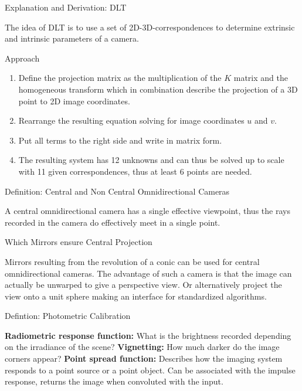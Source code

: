 \documentclass[10pt,a4paper]{scrartcl}
\begin{document}
\begin{multicols*}{2}
\begin{QandA}{Explanation and Derivation: DLT}
\item The idea of DLT is to use a set of 2D-3D-correspondences to determine extrinsic and intrinsic parameters of a camera.
\item Approach
\begin{enumerate}
\item Define the projection matrix as the multiplication of the $K$ matrix and the homogeneous transform which in combination describe the projection of a 3D point to 2D image coordinates.
\item Rearrange the resulting equation solving for image coordinates $u$ and $v$.
\item Put all terms to the right side and write in matrix form.
\item The resulting system has 12 unknowns and can thus be solved up to scale with 11 given correspondences, thus at least 6 points are needed.
\end{enumerate}
\end{QandA}

\begin{QandA}{Definition: Central and Non Central Omnidirectional Cameras}
\item A central omnidirectional camera has a single effective viewpoint, thus the rays recorded in the camera do effectively meet in a single point.
\end{QandA}

\begin{QandA}{Which Mirrors ensure Central Projection}
\item Mirrors resulting from the revolution of a conic can be used for central omnidirectional cameras. The advantage of such a camera is that the image can actually be unwarped to give a perspective view. Or alternatively project the view onto a unit sphere making an interface for standardized algorithms.
\end{QandA}

\begin{QandA}{Defintion: Photometric Calibration}
\item \textbf{Radiometric response function:} What is the brightness recorded depending on the irradiance of the scene?
\textbf{Vignetting:} How much darker do the image corners appear?
\textbf{Point spread function:} Describes how the imaging system responds to a point source or a point object. Can be associated with the impulse response, returns the image when convoluted with the input.
\end{QandA}


\end{multicols*}
\end{document}

